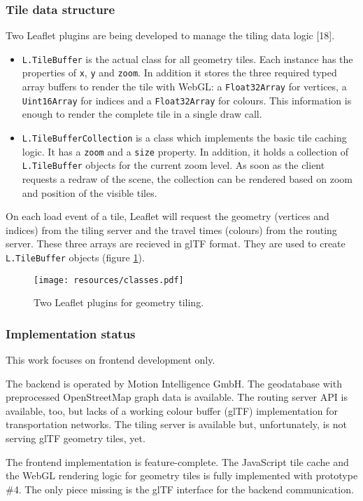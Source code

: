 \documentclass{motivation}
\begin{document}
\subsubsection{Tile data structure}
  \label{sec:tile}
  Two Leaflet plugins are being developed to manage the tiling data logic [18].\par
  \begin{itemize}
    \item \texttt{L.TileBuffer} is the actual class for all geometry tiles. Each instance has the properties of \texttt{x}, \texttt{y} and \texttt{zoom}. In addition it stores the three required typed array buffers to render the tile with WebGL: a \texttt{Float32Array} for vertices, a \texttt{Uint16Array} for indices and a \texttt{Float32Array} for colours. This information is enough to render the complete tile in a single draw call.
    \item \texttt{L.TileBufferCollection} is a class which implements the basic tile caching logic. It has a \texttt{zoom} and a \texttt{size} property. In addition, it holds a collection of \texttt{L.Tile\-Buffer} objects for the current zoom level. As soon as the client requests a redraw of the scene, the collection can be rendered based on zoom and position of the visible tiles.
  \end{itemize}
  On each load event of a tile, Leaflet will request the geometry (vertices and indices) from the tiling server and the travel times (colours) from the routing server. These three arrays are recieved in glTF format. They are used to create \texttt{L.TileBuffer} objects (figure \ref{fig:tbuff}).

  \begin{figure}[h]
    \centering
    \texttt{[image: resources/classes.pdf]}
    \caption{Two Leaflet plugins for geometry tiling.}
    \label{fig:tbuff}
  \end{figure}

\subsubsection{Implementation status}
  This work focuses on frontend development only.\par
  The backend is operated by Motion Intelligence GmbH. The geodatabase with preprocessed OpenStreetMap graph data is available. The routing server API is available, too, but lacks of a working colour buffer (glTF) implementation for transportation networks. The tiling server is available but, unfortunately, is not serving glTF geometry tiles, yet.\par
  The frontend implementation is feature-complete. The Java\-Script tile cache and the WebGL rendering logic for geometry tiles is fully implemented with prototype \#4. The only piece missing is the glTF interface for the backend communication.
\end{document}
